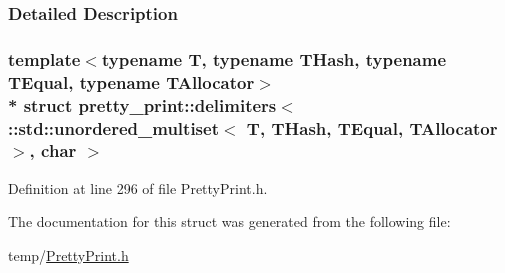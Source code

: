 \subsubsection{Detailed Description}
\subsubsection*{template$<$typename T, typename T\+Hash, typename T\+Equal, typename T\+Allocator$>$\\*
struct pretty\+\_\+print\+::delimiters$<$ \+::std\+::unordered\+\_\+multiset$<$ T, T\+Hash, T\+Equal, T\+Allocator $>$, char $>$}



Definition at line 296 of file Pretty\+Print.\+h.



The documentation for this struct was generated from the following file\+:\begin{DoxyCompactItemize}
\item 
temp/\hyperlink{PrettyPrint_8h}{Pretty\+Print.\+h}\end{DoxyCompactItemize}
